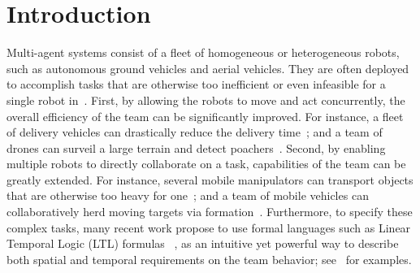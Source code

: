 \section{Introduction}\label{sec:introduction}
Multi-agent systems consist of a fleet of homogeneous or heterogeneous robots,
such as autonomous ground vehicles and aerial vehicles.
They are often deployed to accomplish tasks that are otherwise too inefficient or even infeasible for a single robot in~\citep{arai2002advances}.
First,
by allowing the robots to move and act concurrently,
the overall efficiency of the team can be significantly improved.
For instance,
a fleet of delivery vehicles can drastically reduce the delivery time~\citep{toth2002overview};
and a team of drones can surveil a large terrain and detect poachers~\citep{cliff2015online}.
Second,
by enabling multiple robots to directly collaborate on a task,
capabilities of the team can be greatly extended.
For instance,
several mobile manipulators can transport objects that are otherwise too heavy for one~\citep{fink2008multi};
and a team of mobile vehicles can collaboratively herd moving targets via formation~\citep{varava2017herding}.
Furthermore, to specify these complex tasks,
many recent work propose to use formal languages such as Linear Temporal Logic (LTL)
formulas ~\citep{baier2008principles}, as an intuitive yet powerful way to describe
both spatial and temporal requirements on the team behavior;
see~\citep{ulusoy2013optimality, kantaros2020stylus, schillinger2018simultaneous, guo2018multirobot} for examples.


